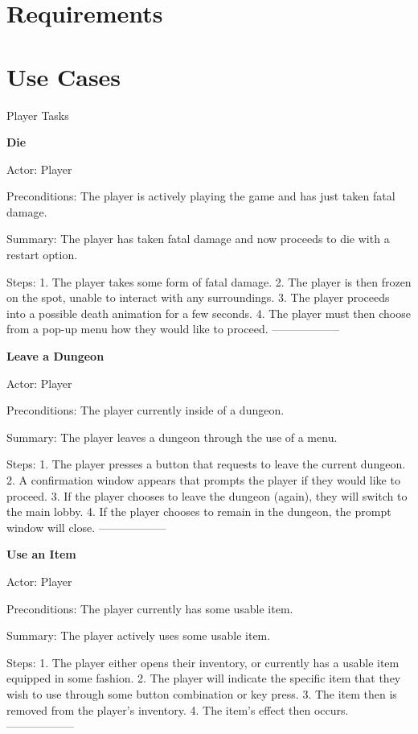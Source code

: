 \documentclass[12pt]{report}
\begin{document}
\chapter{Requirements}

\chapter{Use Cases}
\begin {section}{Player Tasks}

\textbf {Die} %

Actor: Player

Preconditions: The player is actively playing the game and has just taken fatal damage.

Summary: The player has taken fatal damage and now proceeds to die with a restart option.

Steps:
1. The player takes some form of fatal damage.
2. The player is then frozen on the spot, unable to interact with any surroundings.
3. The player proceeds into a possible death animation for a few seconds.
4. The player must then choose from a pop-up menu how they would like to proceed.
------------------

\textbf {Leave a Dungeon} %

Actor: Player

Preconditions: The player currently inside of a dungeon.

Summary: The player leaves a dungeon through the use of a menu.

Steps:
1. The player presses a button that requests to leave the current dungeon.
2. A confirmation window appears that prompts the player if they would like to proceed.
3. If the player chooses to leave the dungeon (again), they will switch to the main lobby.
4. If the player chooses to remain in the dungeon, the prompt window will close.
------------------

\textbf {Use an Item} %

Actor: Player

Preconditions: The player currently has some usable item.

Summary: The player actively uses some usable item.

Steps:
1. The player either opens their inventory, or currently has a usable item equipped in some fashion.
2. The player will indicate the specific item that they wish to use through some button combination or key press.
3. The item then is removed from the player's inventory.
4. The item's effect then occurs.
------------------


\end{section}
\end{document}
